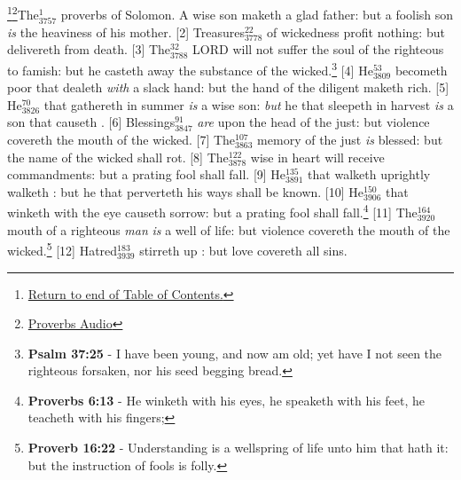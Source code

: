 \footnote{\textcolor[cmyk]{0.99998,1,0,0}{\hyperlink{TOC}{Return to end of Table of Contents.}}}\footnote{\href{https://audiobible.com/bible/}{\textcolor[cmyk]{0.99998,1,0,0}{Proverbs Audio}}}\textcolor[cmyk]{0.99998,1,0,0}{The\textcolor{jungle}{$_{3757}^{1}$} proverbs of Solomon. A wise son maketh a glad father: but a foolish son \emph{is} the heaviness of his mother.}
[2] \textcolor[cmyk]{0.99998,1,0,0}{Treasures\textcolor{jungle}{$_{3778}^{22}$} of wickedness profit nothing: but  delivereth from death.}
[3] \textcolor[cmyk]{0.99998,1,0,0}{The\textcolor{jungle}{$_{3788}^{32}$} LORD will not suffer the soul of the righteous to famish: but he casteth away the substance of the wicked.}\footnote{\textbf{Psalm 37:25} - I have been young, and now am old; yet have I not seen the righteous forsaken, nor his seed begging bread.}
[4] \textcolor[cmyk]{0.99998,1,0,0}{He\textcolor{jungle}{$_{3809}^{53}$} becometh poor that dealeth \emph{with} a slack hand: but the hand of the diligent maketh rich.}
[5] \textcolor[cmyk]{0.99998,1,0,0}{He\textcolor{jungle}{$_{3826}^{70}$} that gathereth in summer \emph{is} a wise son: \emph{but} he that sleepeth in harvest \emph{is} a son that causeth .}
[6] \textcolor[cmyk]{0.99998,1,0,0}{Blessings\textcolor{jungle}{$_{3847}^{91}$} \emph{are} upon the head of the just: but violence covereth the mouth of the wicked.}
[7] \textcolor[cmyk]{0.99998,1,0,0}{The\textcolor{jungle}{$_{3863}^{107}$} memory of the just \emph{is} blessed: but the name of the wicked shall rot.}
[8] \textcolor[cmyk]{0.99998,1,0,0}{The\textcolor{jungle}{$_{3878}^{122}$} wise in heart will receive commandments: but a prating fool shall fall.}
[9] \textcolor[cmyk]{0.99998,1,0,0}{He\textcolor{jungle}{$_{3891}^{135}$} that walketh uprightly walketh : but he that perverteth his ways shall be known.}
[10] \textcolor[cmyk]{0.99998,1,0,0}{He\textcolor{jungle}{$_{3906}^{150}$} that winketh with the eye causeth sorrow: but a prating fool shall fall.}\footnote{\textbf{Proverbs 6:13} - He winketh with his eyes, he speaketh with his feet, he teacheth with his fingers;} 
[11] \textcolor[cmyk]{0.99998,1,0,0}{The\textcolor{jungle}{$_{3920}^{164}$} mouth of a righteous \emph{man} \emph{is} a well of life: but violence covereth the mouth of the wicked.}\footnote{\textbf{Proverb 16:22} - Understanding is a wellspring of life unto him that hath it: but the instruction of fools is folly.}
[12] \textcolor[cmyk]{0.99998,1,0,0}{Hatred\textcolor{jungle}{$_{3939}^{183}$} stirreth up : but love covereth all sins.}
